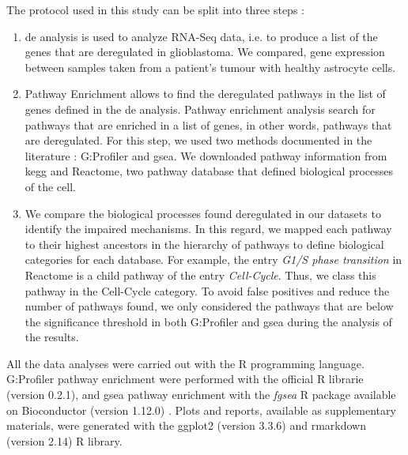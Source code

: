 The protocol used in this study can be split into three steps :
\begin{enumerate}
    \item \acrfull{de} analysis is used to analyze RNA-Seq data, i.e. to produce a list of the genes that are deregulated in glioblastoma.
    We compared, gene expression between samples taken from a patient's tumour with healthy astrocyte cells.
    \item Pathway Enrichment allows to find the deregulated pathways in the list of genes defined in the \acrshort{de} analysis.
    Pathway enrichment analysis search for pathways that are enriched in a list of genes, in other words, pathways that are deregulated.
    For this step, we used two methods documented in the literature : G:Profiler and \acrfull{gsea}.
    We downloaded pathway information from \acrfull{kegg} and Reactome, two pathway database that defined biological processes of the cell.
    \item We compare the biological processes found deregulated in our datasets to identify the impaired mechanisms.
    In this regard, we mapped each pathway to their highest ancestors in the hierarchy of pathways to define biological categories for each database.
    For example, the entry \textit{G1/S phase transition} in Reactome is a child pathway of the entry \textit{Cell-Cycle}.
    Thus, we class this pathway in the Cell-Cycle category.
    To avoid false positives and reduce the number of pathways found, we only considered the pathways that are below the significance threshold in both G:Profiler and \acrshort{gsea} during the analysis of the results.
\end{enumerate}
All the data analyses were carried out with the R programming language.
G:Profiler pathway enrichment were performed with the official R librarie (version 0.2.1), and \acrshort{gsea} pathway enrichment with the \textit{fgsea} R package available on Bioconductor (version 1.12.0) \cite*{Korotkevich2021}.
Plots and reports, available as supplementary materials, were generated with the ggplot2 (version 3.3.6) and rmarkdown (version 2.14) R library.


